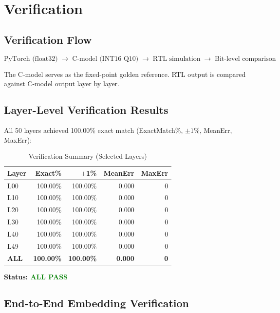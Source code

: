 \section{Verification}
\label{sec:verify}
 
\subsection{Verification Flow}
 
\[
  \text{PyTorch (float32)} \;\rightarrow\;
  \text{C-model (INT16 Q10)} \;\rightarrow\;
  \text{RTL simulation} \;\rightarrow\;
  \text{Bit-level comparison}
\]
 
The C-model serves as the fixed-point golden reference. RTL output is compared against C-model output layer by layer.
 
\subsection{Layer-Level Verification Results}
 
All 50 layers achieved 100.00\% exact match (ExactMatch\%, $\pm1\%$, MeanErr, MaxErr):
 
\begin{table}[H]
\centering
\caption{Verification Summary (Selected Layers)}
\begin{tabular}{lrrrr}
\toprule
\textbf{Layer} & \textbf{Exact\%} & \textbf{$\pm$1\%} & \textbf{MeanErr} & \textbf{MaxErr} \\
\midrule
L00 & 100.00\% & 100.00\% & 0.000 & 0 \\
L10 & 100.00\% & 100.00\% & 0.000 & 0 \\
L20 & 100.00\% & 100.00\% & 0.000 & 0 \\
L30 & 100.00\% & 100.00\% & 0.000 & 0 \\
L40 & 100.00\% & 100.00\% & 0.000 & 0 \\
L49 & 100.00\% & 100.00\% & 0.000 & 0 \\
\midrule
\textbf{ALL} & \textbf{100.00\%} & \textbf{100.00\%} & \textbf{0.000} & \textbf{0} \\
\bottomrule
\end{tabular}
\end{table}
 
\textbf{Status: \textcolor{green}{ALL PASS}}
 
\subsection{End-to-End Embedding Verification}
 
